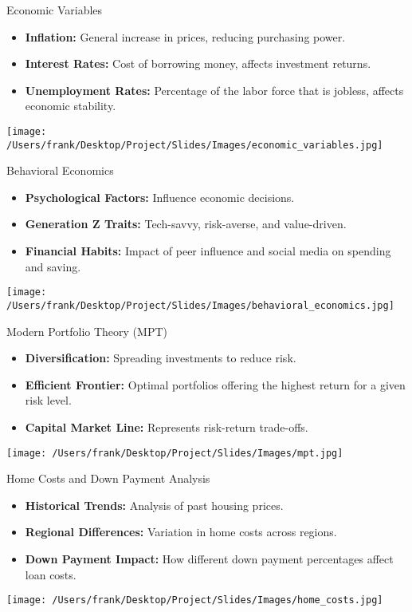 \documentclass{beamer}
\begin{document}
\begin{frame}{Economic Variables}
    \begin{itemize}
        \item \textbf{Inflation:} General increase in prices, reducing purchasing power.
        \item \textbf{Interest Rates:} Cost of borrowing money, affects investment returns.
        \item \textbf{Unemployment Rates:} Percentage of the labor force that is jobless, affects economic stability.
    \end{itemize}
    \centering
    \texttt{[image: /Users/frank/Desktop/Project/Slides/Images/economic\_variables.jpg]}
\end{frame}

\begin{frame}{Behavioral Economics}
    \begin{itemize}
        \item \textbf{Psychological Factors:} Influence economic decisions.
        \item \textbf{Generation Z Traits:} Tech-savvy, risk-averse, and value-driven.
        \item \textbf{Financial Habits:} Impact of peer influence and social media on spending and saving.
    \end{itemize}
    \centering
    \texttt{[image: /Users/frank/Desktop/Project/Slides/Images/behavioral\_economics.jpg]}
\end{frame}

\begin{frame}{Modern Portfolio Theory (MPT)}
    \begin{itemize}
        \item \textbf{Diversification:} Spreading investments to reduce risk.
        \item \textbf{Efficient Frontier:} Optimal portfolios offering the highest return for a given risk level.
        \item \textbf{Capital Market Line:} Represents risk-return trade-offs.
    \end{itemize}
    \centering
    \texttt{[image: /Users/frank/Desktop/Project/Slides/Images/mpt.jpg]}
\end{frame}

\begin{frame}{Home Costs and Down Payment Analysis}
    \begin{itemize}
        \item \textbf{Historical Trends:} Analysis of past housing prices.
        \item \textbf{Regional Differences:} Variation in home costs across regions.
        \item \textbf{Down Payment Impact:} How different down payment percentages affect loan costs.
    \end{itemize}
    \centering
    \texttt{[image: /Users/frank/Desktop/Project/Slides/Images/home\_costs.jpg]}
\end{frame}
\end{document}
